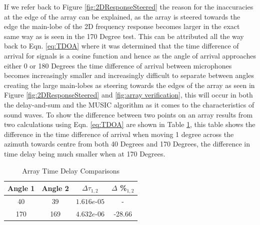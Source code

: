 \documentclass{UoNMCHA}
\numberwithin{equation}{section}
\newcommand{\ra}[1]{\renewcommand{\arraystretch}{#1}}   %
\begin{document}
    If we refer back to Figure \ref{fig:2DResponseSteered} the reason for the inaccuracies at the edge of the array can be explained, as the array is steered towards the edge the main-lobe of the 2D frequency response becomes larger in the exact same way as is seen in the 170 Degree test. This can be attributed all the way back to Eqn. \ref{eq:TDOA} where it was determined that the time difference of arrival for signals is a cosine function and hence as the angle of arrival approaches either 0 or 180 Degrees the time difference of arrival between microphones becomes increasingly smaller and increasingly difficult to separate between angles creating the large main-lobes as steering towards the edges of the array as seen in Figure \ref{fig:2DResponseSteered} and \ref{fig:array verification}, this will occur in both the delay-and-sum and the MUSIC algorithm as it comes to the characteristics of sound waves. To show the difference between two points on an array results from two calculations using Eqn. \ref{eq:TDOA} are shown in Table \ref{tab:TimeDelay}, this table shows the difference in the time difference of arrival when moving 1 degree across the azimuth towards centre from both 40 Degrees and 170 Degrees, the difference in time delay being much smaller when at 170 Degrees.

    \begin{table}[H]
        \centering
        \ra{1}
        \caption{Array Time Delay Comparisons} 
        \begin{tabular}{cccc}
            \toprule
            Angle 1 & Angle 2 & $\Delta\tau_{1,2}$ & $\Delta$ \%$_{1,2}$ \\
            \midrule
            40 & 39 & $1.616e$-$05$ & - \\
            170 & 169 & $4.632e$-$06$ & -28.66 \\
            \bottomrule
        \end{tabular}
        \label{tab:TimeDelay}
    \end{table}
    
\end{document}
